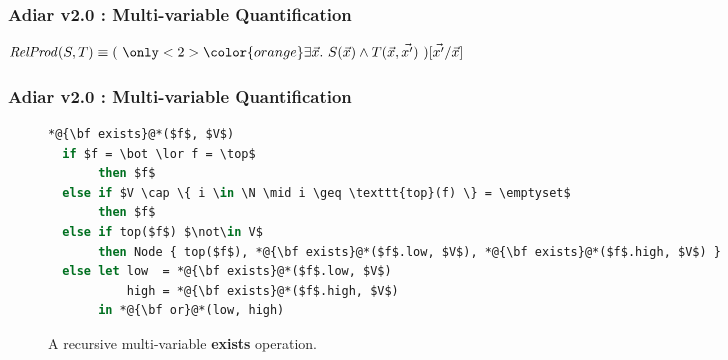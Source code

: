 \documentclass[english, aspectratio=169]{beamer}
\begin{document}
\begin{frame}{} %
  \begin{figure}
    \centering


    \begin{tikzpicture}
      
    \end{tikzpicture}
  \end{figure}
\end{frame}

\begin{frame}
  \frametitle{Adiar v2.0 : Multi-variable Quantification}

  \begin{center}
    \LARGE

    $\mathit{RelProd}(S,T)
    \equiv
    (
    \ {\only<2>{\color{orange}}\exists \vec{x} .}\
    S(\vec{x}) \wedge T(\vec{x}, \vec{x'})
    \ ) [\vec{x'} / \vec{x}]$
  \end{center}
\end{frame}

\begin{frame}[fragile]
  \frametitle{Adiar v2.0 : Multi-variable Quantification}

  \begin{figure}
    \centering

    \begin{lstlisting}[language=sml]
*@{\bf exists}@*($f$, $V$)
  if $f = \bot \lor f = \top$
       then $f$
  else if $V \cap \{ i \in \N \mid i \geq \texttt{top}(f) \} = \emptyset$
       then $f$
  else if top($f$) $\not\in V$
       then Node { top($f$), *@{\bf exists}@*($f$.low, $V$), *@{\bf exists}@*($f$.high, $V$) }
  else let low  = *@{\bf exists}@*($f$.low, $V$)
           high = *@{\bf exists}@*($f$.high, $V$)
       in *@{\bf or}@*(low, high)
    \end{lstlisting}
  \caption{A recursive multi-variable {\bf exists} operation.}
\end{figure}


\end{frame}
\end{document}

